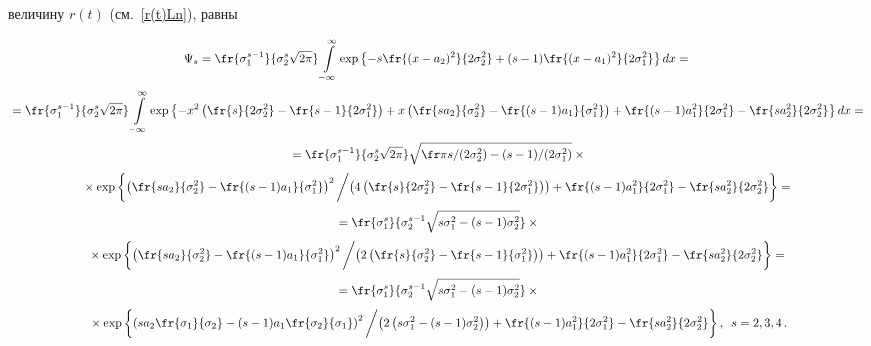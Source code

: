величину $r(t)$ (см.~\eqref{r(t)Ln}), равны

\begin{multline*}

\Psi_s=\fr{\sigma^{s-1}_1}{\sigma_2^s\sqrt{2\pi}}\int\limits_{-\infty}^\infty

\exp{\left\{-s\fr{(x-a_2)^2}{2\sigma_2^2}+(s-1)\fr{(x-a_1)^2}{2\sigma_1^2}\right\}}\,dx={}\\[3pt]

{}=\fr{\sigma^{s-1}_1}{\sigma_2^s\sqrt{2\pi}}\int\limits_{-\infty}^\infty

\exp{\left\{-x^2\left(\fr{s}{2\sigma_2^2}-\fr{s-1}{2\sigma_1^2}\right)+x\left(

\fr{sa_2}{\sigma_2^2}-\fr{(s-1)a_1}{\sigma_1^2}

\right)+\fr{(s-1)a_1^2}{2\sigma_1^2}-\fr{s a_2^2}{2\sigma_2^2}\right\}}\,dx={}\\[3pt]

{}=\fr{\sigma^{s-1}_1}{\sigma_2^s\sqrt{2\pi}}

\sqrt{\fr\pi{{s}/({2\sigma_2^2})-(s-1)/(2\sigma_1^2)}}\times{}\\[3pt]

{}\times\exp{\left\{\left(\fr{s a_2}{\sigma_2^2}-

\fr{(s-1)a_1}{\sigma_1^2}

\right)^2\biggl{/}\left(4\left(\fr{s}{2\sigma_2^2}-\fr{s-1}{2\sigma_1^2}\right)\right)

+\fr{(s-1)a_1^2}{2\sigma_1^2}-\fr{s a_2^2}{2\sigma_2^2}\right\}}={}\\[3pt]

{}=\fr{\sigma_1^s}{\sigma_2^{s-1}\sqrt{s\sigma_1^2-(s-1)\sigma_2^2}}\times{}\\[3pt]

{}\times\exp{\left\{\left(\fr{s a_2}{\sigma_2^2}-\fr{(s-1)a_1}{\sigma_1^2}

\right)^2\biggl{/}\left(2\left(\fr{s}{\sigma_2^2}-\fr{s-1}{\sigma_1^2}\right)\right)

+\fr{(s-1)a_1^2}{2\sigma_1^2}-\fr{s a_2^2}{2\sigma_2^2}\right\}}={}\\[3pt]

{}=\fr{\sigma_1^s}{\sigma_2^{s-1}\sqrt{s\sigma_1^2-(s-1)\sigma_2^2}}\times{}\\[3pt]

{}\times\exp{\left\{\left(s a_2 \fr{\sigma_1}{\sigma_2}-(s-1)a_1

\fr{\sigma_2}{\sigma_1}\right)^2

\biggl{/}\left(2\left(s\sigma_1^2-(s-1)\sigma_2^2\right)\right)

+\fr{(s-1)a_1^2}{2\sigma_1^2}-\fr{s a_2^2}{2\sigma_2^2}\right\}}\,,\enskip

s=2,3,4\,.

\end{multline*}



